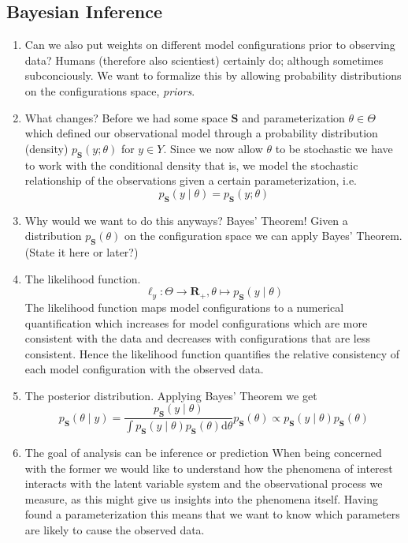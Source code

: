 {\subsection{Bayesian Inference}
\begin{enumerate}
  \item Can we also put weights on different model configurations prior to observing data? Humans (therefore also scientiest) certainly do; although sometimes subconciously. We want to formalize this by allowing probability distributions on the configurations space, \emph{priors}.
  \item What changes? Before we had some space $\mathbf{S}$ and parameterization $\theta \in \Theta$ which defined our observational model through a probability distribution (density) $p_{\mathbf{S}}(y; \theta)$ for $y \in Y$.
    Since we now allow $\theta$ to be stochastic we have to work with the conditional density that is, we model the stochastic relationship of the observations given a certain parameterization, i.e. $$p_{\mathbf{S}}(y \mid \theta) = p_{\mathbf{S}}(y; \theta)$$
  \item Why would we want to do this anyways? Bayes' Theorem!
    Given a distribution $p_{\mathbf{S}}(\theta)$ on the configuration space we can apply Bayes' Theorem. (State it here or later?)
  \item The likelihood function.$$\ell_{y} : \Theta \to \mathbf{R}_+, \theta \mapsto p_{\mathbf{S}}(y \mid \theta)$$
    The likelihood function maps model configurations to a numerical quantification which increases for model configurations which are more consistent with the data and decreases with configurations that are less consistent.
    Hence the likelihood function quantifies the relative consistency of each model configuration with the observed data.
  \item The posterior distribution. Applying Bayes' Theorem we get $$p_{\mathbf{S}}(\theta \mid y) = \frac{p_{\mathbf{S}}(y \mid \theta)}{\int p_{\mathbf{S}}(y \mid \theta) p_{\mathbf{S}}(\theta) \mathrm{d}\theta} p_{\mathbf{S}} (\theta) \propto p_{\mathbf{S}}(y \mid \theta) p_{\mathbf{S}}(\theta)$$
  \item The goal of analysis can be inference or prediction
    When being concerned with the former we would like to understand how the phenomena of interest interacts with the latent variable system and the observational process we measure, as this might give us insights into the phenomena itself.
    Having found a parameterization this means that we want to know which parameters are likely to cause the observed data.

\end{enumerate}}
